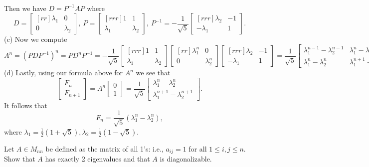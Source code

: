 \begin{solution}
\\
Then we have $D=P^{-1}AP$ where 
\[
D=\begin{bmatrix}[rr]
\lambda_1&0\\
0&\lambda_2
\end{bmatrix}, \ P=\begin{bmatrix}[rrr]
1&1\\
\lambda_1&\lambda_2
\end{bmatrix}, \ P^{-1}=-\frac{1}{\sqrt{5}}\begin{bmatrix}[rrr]
\lambda_2&-1\\
-\lambda_1&1
\end{bmatrix}.
\]
(c) 
Now we compute  
\[
A^n=(PDP^{-1})^n=PD^nP^{-1}=-\frac{1}{\sqrt{5}}\begin{bmatrix}[rrr]
1&1\\
\lambda_1&\lambda_2
\end{bmatrix}\begin{bmatrix}[rr]
\lambda_1^n&0\\
0&\lambda_2^n
\end{bmatrix}\begin{bmatrix}[rrr]
\lambda_2&-1\\
-\lambda_1&1
\end{bmatrix}
=\frac{1}{\sqrt{5}}\begin{bmatrix}
\lambda_1^{n-1}-\lambda_2^{n-1}&\lambda_1^n-\lambda_2^n\\
\lambda_1^n-\lambda_2^n&\lambda_1^{n+1}-\lambda_2^{n+1}
\end{bmatrix}
\]
(d) Lastly, using our formula above for $A^n$ we see that
\[
\begin{bmatrix}
F_n\\
F_{n+1}
\end{bmatrix}=A^n\begin{bmatrix}
0\\1
\end{bmatrix}
=\frac{1}{\sqrt{5}}\begin{bmatrix}
\lambda_1^n-\lambda_2^n\\
\lambda_1^{n+1}-\lambda_2^{n+1}
\end{bmatrix}.
\]
It follows that 
\[
F_n=\frac{1}{\sqrt{5}}(\lambda_1^{n}-\lambda_2^n), 
\]
where $\lambda_1=\frac{1}{2}(1+\sqrt{5}), \lambda_2=\frac{1}{2}(1-\sqrt{5})$. 
\end{solution}
\ii Let $A\in M_{nn}$ be defined as the matrix of all 1's: i.e., $a_{ij}=1$ for all $1\leq i, j\leq n$. 
\\
Show that $A$ has exactly 2 eigenvalues and that $A$ is diagonalizable. 
